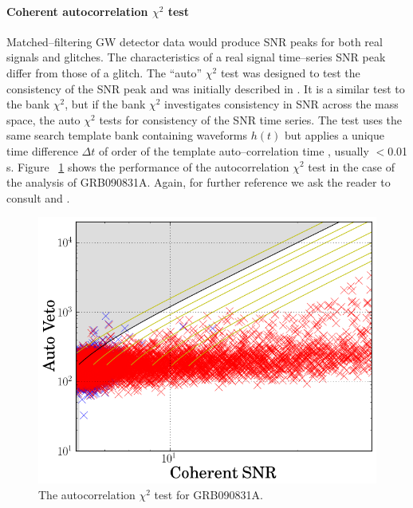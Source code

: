 \paragraph{Coherent autocorrelation $\chi^2$ test}
Matched--filtering \ac{GW} detector data would produce SNR peaks for both real signals and glitches. The characteristics of a real signal time--series SNR peak differ from those of a glitch. The ``auto'' $\chi^{2}$ test was designed to test the consistency of the \ac{SNR} peak and was initially described in \cite{Hanna:2008}.  It is a similar test to the bank $\chi^{2}$, but if the bank $\chi^{2}$ investigates consistency in \ac{SNR} across the mass space, the auto $\chi^{2}$ tests for consistency of the \ac{SNR} time series.  The test uses the same search template bank containing waveforms $h(t)$ but applies a unique time difference $\Delta t$ of order of the template auto--correlation time , usually $<$0.01 s. Figure ~\ref{cohauto} shows the performance of the autocorrelation $\chi^2$ test in the case of the analysis of GRB090831A. Again, for further reference we ask the reader to consult \cite{Hanna:2008} and \cite{Harry:2011qh}.
%
\begin{figure}[ht]
\centering
\includegraphics[scale=0.45]{Images/cohAuto.png}
\caption{The autocorrelation $\chi^2$ test for GRB090831A.}
\label{cohauto}
\end{figure}

